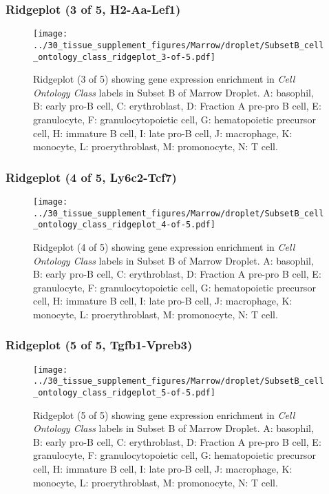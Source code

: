 \clearpage

\subsubsection{Ridgeplot (3 of 5, H2-Aa-Lef1)}
\begin{figure}[h]
\centering
\texttt{[image: ../30\_tissue\_supplement\_figures/Marrow/droplet/SubsetB\_cell\_ontology\_class\_ridgeplot\_3-of-5.pdf]}

\caption{ Ridgeplot (3 of 5)  showing gene expression enrichment in \emph{Cell Ontology Class} labels in Subset B of Marrow Droplet. A: basophil, B: early pro-B cell, C: erythroblast, D: Fraction A pre-pro B cell, E: granulocyte, F: granulocytopoietic cell, G: hematopoietic precursor cell, H: immature B cell, I: late pro-B cell, J: macrophage, K: monocyte, L: proerythroblast, M: promonocyte, N: T cell.}
\end{figure}


\clearpage

\subsubsection{Ridgeplot (4 of 5, Ly6c2-Tcf7)}
\begin{figure}[h]
\centering
\texttt{[image: ../30\_tissue\_supplement\_figures/Marrow/droplet/SubsetB\_cell\_ontology\_class\_ridgeplot\_4-of-5.pdf]}

\caption{ Ridgeplot (4 of 5)  showing gene expression enrichment in \emph{Cell Ontology Class} labels in Subset B of Marrow Droplet. A: basophil, B: early pro-B cell, C: erythroblast, D: Fraction A pre-pro B cell, E: granulocyte, F: granulocytopoietic cell, G: hematopoietic precursor cell, H: immature B cell, I: late pro-B cell, J: macrophage, K: monocyte, L: proerythroblast, M: promonocyte, N: T cell.}
\end{figure}


\clearpage

\subsubsection{Ridgeplot (5 of 5, Tgfb1-Vpreb3)}
\begin{figure}[h]
\centering
\texttt{[image: ../30\_tissue\_supplement\_figures/Marrow/droplet/SubsetB\_cell\_ontology\_class\_ridgeplot\_5-of-5.pdf]}

\caption{ Ridgeplot (5 of 5)  showing gene expression enrichment in \emph{Cell Ontology Class} labels in Subset B of Marrow Droplet. A: basophil, B: early pro-B cell, C: erythroblast, D: Fraction A pre-pro B cell, E: granulocyte, F: granulocytopoietic cell, G: hematopoietic precursor cell, H: immature B cell, I: late pro-B cell, J: macrophage, K: monocyte, L: proerythroblast, M: promonocyte, N: T cell.}
\end{figure}


